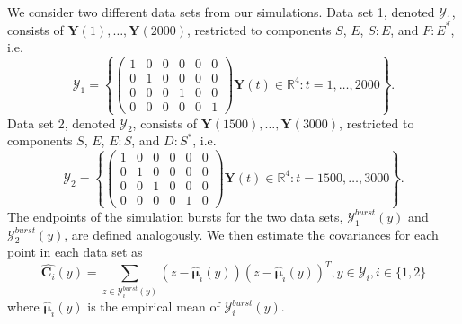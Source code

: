 \documentclass[aip,jcp,preprint]{revtex4-1}
\begin{document}
We consider two different data sets from our simulations.
%
Data set 1, denoted $\mathcal{Y}_1$, consists of $\mathbf{Y}(1), \dots, \mathbf{Y}(2000)$, restricted to components $S$, $E$, $S:E$, and $F:E^{*}$, i.e.
$$\mathcal{Y}_1 = \left\{
\left( \begin{array}{cccccc}
1 & 0 & 0 & 0 & 0 & 0 \\
0 & 1 & 0 & 0 & 0 & 0 \\
0 & 0 & 0 & 1 & 0 & 0 \\
0 & 0 & 0 & 0 & 0 & 1
\end{array} \right) \mathbf{Y}(t) \in \mathbb{R}^4: t=1, \dots, 2000 \right\}.$$
%
Data set 2, denoted $\mathcal{Y}_2$, consists of $\mathbf{Y}(1500), \dots, \mathbf{Y}(3000)$, restricted to components $S$, $E$, $E:S$, and $D:S^{*}$, i.e.
$$\mathcal{Y}_2 = \left\{
\left( \begin{array}{cccccc}
1 & 0 & 0 & 0 & 0 & 0 \\
0 & 1 & 0 & 0 & 0 & 0 \\
0 & 0 & 1 & 0 & 0 & 0 \\
0 & 0 & 0 & 0 & 1 & 0
\end{array} \right)
\mathbf{Y}(t) \in \mathbb{R}^4: t=1500, \dots, 3000 \right\}.$$
%
The endpoints of the simulation bursts for the two data sets, $\mathcal{Y}^{burst}_1(y)$ and $\mathcal{Y}^{burst}_2(y)$, are defined analogously.
%
We then estimate the covariances for each point in each data set as
\begin{equation}
\widehat{\mathbf{C}_i}(y) = \sum_{z \in \mathcal{Y}^{burst}_i(y)} \left( z - \hat{\mathbf{\mu}}_i(y) \right)\left( z - \hat{\mathbf{\mu}}_i(y) \right)^T, y \in \mathcal{Y}_i, i \in \{1, 2\}
\end{equation}
where $\hat{\mathbf{\mu}}_i(y)$ is the empirical mean of $\mathcal{Y}^{burst}_i(y)$.
\end{document}
